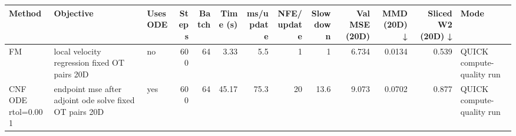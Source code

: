 \begin{tabular}{lllrrrrrrrrrl}
\toprule
Method & Objective & Uses ODE & Steps & Batch & Time (s) & ms/update & NFE/update & Slowdown & Val MSE (20D) & MMD (20D) ↓ & Sliced W2 (20D) ↓ & Mode \\
\midrule
FM & local velocity regression fixed OT pairs 20D & no & 600 & 64 & 3.33 & 5.5 & 1 & 1 & 6.734 & 0.0134 & 0.539 & QUICK compute-quality run \\
CNF ODE rtol=0.001 & endpoint mse after adjoint ode solve fixed OT pairs 20D & yes & 600 & 64 & 45.17 & 75.3 & 20 & 13.6 & 9.073 & 0.0702 & 0.877 & QUICK compute-quality run \\
\bottomrule
\end{tabular}
